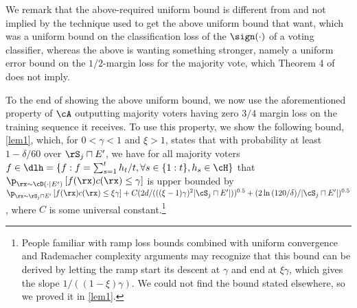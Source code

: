   We remark that the above-required uniform bound is different from and not implied by the technique used to get the above uniform bound that \cite{Optimalweaktostronglearning} want, which was a uniform bound on the classification loss of the $ \sign(\cdot) $ of a voting classifier, whereas the above is wanting something stronger, namely a uniform error bound on the $ 1/2 $-margin loss for the majority vote, which Theorem 4 of \cite{Optimalweaktostronglearning} does not imply. 

To the end of showing the above uniform bound, we now use the aforementioned property of $ \cA $ outputting majority voters having zero  $ 3/4$ margin loss on the training sequence it receives. 
To use this property, we show the following bound, \cref{lem1},
which, for $0< \gamma< 1 $ and $ \xi>1 $, states that with probability at least $ 1-\delta/60 $ over $ \rS_{j}\sqcap E' $, we have for all majority voters $ f\in\dlh=\{f:f=\sum_{s=1}^{t} h_{t}/t, \forall s\in\{1:t\}, h_{s}\in \cH\} $ that $ \p_{\rx\sim\cD(\cdot |E')}\left[f(\rx)c(\rx)\leq \gamma\right]$ is upper bounded by $ \p_{\rx\sim \rS_{j}\sqcap E'}\left[f(\rx)c(\rx)\leq \xi\gamma\right] +C(2d/(((\xi-1)\gamma)^{2}|\cS_{j}\sqcap E'|))^{0.5}+(2\ln{\left(120/\delta \right)}/|\cS_{j}\sqcap E'|)^{0.5} $, where $ C $ is some universal constant.\footnote{People familiar with ramp loss bounds combined with uniform convergence and Rademacher complexity arguments may recognize that this bound can be derived by letting the ramp start its descent at $ \gamma $ and end at $ \xi \gamma $, which gives the slope $ 1/((1-\xi)\gamma)$. We could not find the bound stated elsewhere, so we proved it in \cref{lem1}.}  

